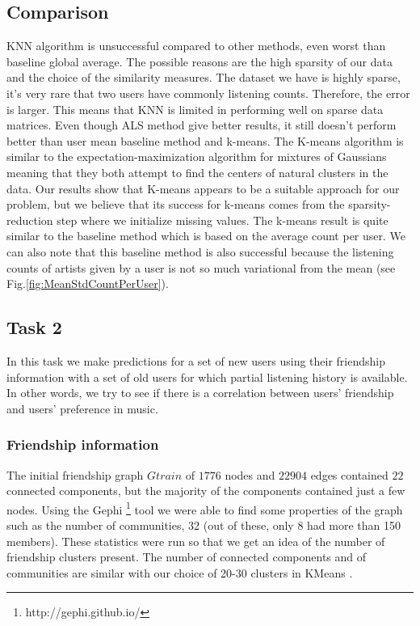 \subsection{Comparison}

KNN algorithm is unsuccessful compared to other methods, even worst than baseline global average. The possible reasons are the high sparsity of our data and the choice of the similarity measures. The dataset we have is highly sparse, it’s very rare that two users have commonly listening counts. Therefore, the error is larger. This means that KNN is limited in  performing well on sparse data matrices. Even though ALS method give better results, it still doesn't perform better than user mean baseline method and k-means. The K-means algorithm is similar to the expectation-maximization algorithm for mixtures of Gaussians meaning that they both attempt to find the centers of natural clusters in the data. Our results show that K-means appears to be a suitable approach for our problem, but we believe that its success for k-means comes from the sparsity-reduction step where we initialize missing values. The k-means result is quite similar to the baseline method which is based on the average count per user. We can also note that this baseline method is also successful because the listening counts of artists given by a user is not so much variational from the mean (see Fig.\ref{fig:MeanStdCountPerUser}).

\subsection{Task 2}
In this task we make predictions for a set of new users using their friendship information with a set of old users for which partial listening history is available. In other words, we try to see if there is a correlation between
users' friendship and users' preference in music.

\subsubsection{Friendship information}
The initial friendship graph $Gtrain$ of $1776$ nodes and $22904$ edges contained $22$ connected components, but the majority of the components contained just a few nodes.
Using the Gephi  \footnote{http://gephi.github.io/} tool we were able to find some properties of the graph such as the number of communities, 32 (out of these, only 8  had more than 150 members).
These statistics were run so that we get an idea of the number of friendship clusters present. The number of connected components and of communities are similar with our choice of 20-30 clusters in KMeans .

